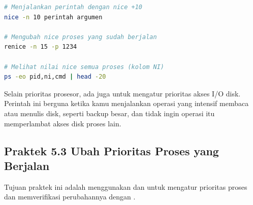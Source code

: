 \begin{lstlisting}[language=bash, caption={Sintaks nice dan renice}]
# Menjalankan perintah dengan nice +10
nice -n 10 perintah argumen

# Mengubah nice proses yang sudah berjalan
renice -n 15 -p 1234

# Melihat nilai nice semua proses (kolom NI)
ps -eo pid,ni,cmd | head -20
\end{lstlisting}

Selain prioritas prosesor, ada juga  untuk mengatur prioritas akses I/O disk.
Perintah ini berguna ketika kamu menjalankan operasi yang intensif membaca atau menulis
disk, seperti backup besar, dan tidak ingin operasi itu memperlambat akses disk proses lain.

\subsection*{Praktek 5.3 Ubah Prioritas Proses yang Berjalan}

Tujuan praktek ini adalah menggunakan  dan  untuk mengatur
prioritas proses dan memverifikasi perubahannya dengan .

